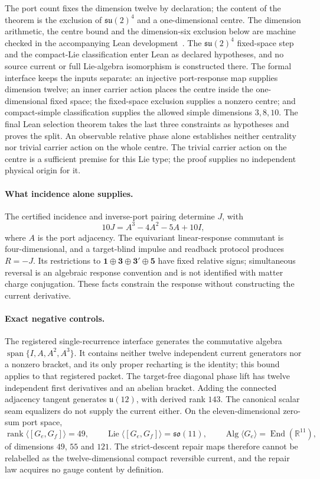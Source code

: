 \documentclass[11pt]{article}
\begin{document}
The port count fixes the dimension twelve by declaration; the content of the
theorem is the exclusion of \(\mathfrak{su}(2)^4\) and a one-dimensional
centre. The dimension arithmetic, the centre bound and the dimension-six
exclusion below are machine checked in the accompanying Lean
development~\cite{ophrepo}. The \(\mathfrak{su}(2)^{4}\) fixed-space step and
the compact-Lie classification enter Lean as declared hypotheses, and no
source current or full Lie-algebra isomorphism is constructed there. The
formal interface keeps the inputs separate: an injective port-response map
supplies dimension twelve; an inner carrier action places the centre inside
the one-dimensional fixed space; the fixed-space exclusion supplies a nonzero
centre; and compact-simple classification supplies the allowed simple
dimensions \(3,8,10\). The final Lean selection theorem takes the last three
constraints as hypotheses and proves the split. An observable relative phase
alone establishes neither centrality nor trivial carrier action on the whole
centre. The trivial carrier action on the centre is a sufficient premise for
this Lie type; the proof supplies no independent physical origin for it.

\paragraph{What incidence alone supplies.}
\label{thm:echosahedral-source-selector}
The certified incidence and inverse-port pairing determine \(J\), with
\[
10J=A^3-4A^2-5A+10I,
\]
where \(A\) is the port adjacency. The equivariant linear-response commutant
is four-dimensional, and a target-blind impulse and readback protocol
produces \(R=-J\). Its restrictions to
\(\mathbf1\oplus\mathbf3\oplus\mathbf3'\oplus\mathbf5\) have fixed relative
signs; simultaneous reversal is an algebraic response convention and is not
identified with matter charge conjugation. These facts constrain the
response without constructing the current derivative.

\paragraph{Exact negative controls.}
The registered single-recurrence interface generates the commutative algebra
\(\operatorname{span}\{I,A,A^2,A^3\}\). It contains neither twelve
independent current generators nor a nonzero bracket, and its only proper
recharting is the identity; this bound applies to that registered packet. The
target-free diagonal phase lift has twelve independent first derivatives and
an abelian bracket. Adding the connected adjacency tangent generates
\(\mathfrak u(12)\), with derived rank \(143\). The canonical scalar seam
equalizers do not supply the current either. On the eleven-dimensional
zero-sum port space,
\[
 \operatorname{rank}\langle [G_e,G_f]\rangle=49,
 \qquad
 \operatorname{Lie}\langle [G_e,G_f]\rangle=\mathfrak{so}(11),
 \qquad
 \operatorname{Alg}\langle G_e\rangle=\operatorname{End}(\mathbb R^{11}),
\]
of dimensions \(49\), \(55\) and \(121\). The strict-descent repair maps
therefore cannot be relabelled as the twelve-dimensional compact reversible
current, and the repair law acquires no gauge content by definition.
\end{document}
